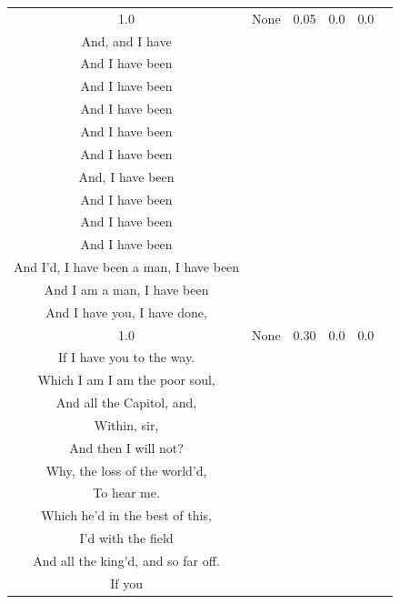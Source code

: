 \documentclass[11pt]{book}
\theoremstyle{plain}
\theoremstyle{definition}
\begin{document}
\begin{longtable}{ccccc >{\raggedright\arraybackslash}p{8cm}}
    1.0 & None & 0.05 & 0.0 & 0.0 &
    \begin{tcolorbox}[breakable, enhanced jigsaw, frame hidden, colback=white, boxrule=0pt]
    KING RICHARD:\\
    And, and I have\\
    And I have been\\
    And I have been\\
    And I have been\\
    And I have been\\
    And I have been\\
    And, I have been\\
    And I have been\\
    And I have been\\
    And I have been\\
    And I'd, I have been a man, I have been\\
    And I am a man, I have been\\
    And I have you, I have done,
    \end{tcolorbox} \\
    
    1.0 & None & 0.30 & 0.0 & 0.0 &
    \begin{tcolorbox}[breakable, enhanced jigsaw, frame hidden, colback=white, boxrule=0pt]
    KING RICHARD:\\
    If I have you to the way.\\
    Which I am I am the poor soul,\\
    And all the Capitol, and,\\
    Within, sir,\\
    And then I will not?\\
    Why, the loss of the world'd,\\
    To hear me.\\
    Which he'd in the best of this,\\
    I'd with the field\\
    And all the king'd, and so far off.\\
    If you
    \end{tcolorbox} \\
    

\end{longtable}
\end{document}
